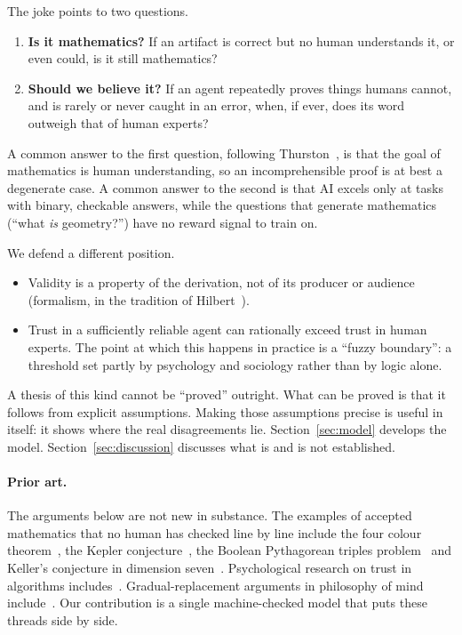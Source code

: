 \documentclass[11pt]{article}
\theoremstyle{definition}
\theoremstyle{remark}
\begin{document}
The joke points to two questions.
\begin{enumerate}
\item \textbf{Is it mathematics?} If an artifact is correct but no human understands it, or
even could, is it still mathematics?
\item \textbf{Should we believe it?} If an agent repeatedly proves things humans cannot, and
is rarely or never caught in an error, when, if ever, does its word outweigh that of human
experts?
\end{enumerate}
A common answer to the first question, following Thurston~\cite{thurston}, is that the goal of
mathematics is human understanding, so an incomprehensible proof is at best a degenerate case.
A common answer to the second is that AI excels only at tasks with binary, checkable answers,
while the questions that generate mathematics (``what \emph{is} geometry?'') have no reward
signal to train on.

We defend a different position.
\begin{itemize}
\item[(T1)] Validity is a property of the derivation, not of its producer or audience
(formalism, in the tradition of Hilbert~\cite{zach}).
\item[(T2)] Trust in a sufficiently reliable agent can rationally exceed trust in human
experts. The point at which this happens in practice is a ``fuzzy boundary'': a threshold set
partly by psychology and sociology rather than by logic alone.
\end{itemize}
A thesis of this kind cannot be ``proved'' outright. What can be proved is that it follows from
explicit assumptions. Making those assumptions precise is useful in itself: it shows where the
real disagreements lie. Section~\ref{sec:model} develops the model. Section~\ref{sec:discussion}
discusses what is and is not established.

\paragraph{Prior art.} The arguments below are not new in substance. The examples of accepted
mathematics that no human has checked line by line include the four colour
theorem~\cite{appelhaken}, the Kepler conjecture~\cite{flyspeck}, the Boolean Pythagorean
triples problem~\cite{bpt} and Keller's conjecture in dimension seven~\cite{keller}.
Psychological research on trust in algorithms includes~\cite{dietvorst}. Gradual-replacement
arguments in philosophy of mind include~\cite{chalmers}. Our contribution is a single
machine-checked model that puts these threads side by side.
\end{document}
